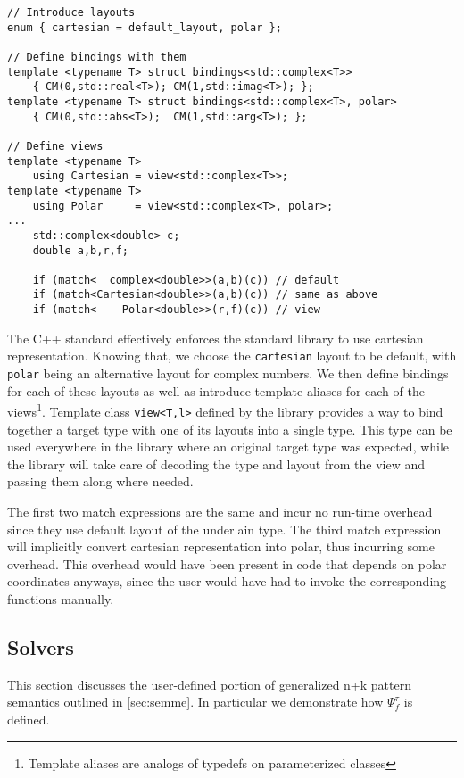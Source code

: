 \documentclass[preprint]{sigplanconf}
\makeatletter
\DeclareRobustCommand{\code}[1]{{\lstinline[breaklines=false,escapechar=@]{#1}}}
\makeatother
\begin{document}
\begin{lstlisting}
// Introduce layouts
enum { cartesian = default_layout, polar };

// Define bindings with them
template <typename T> struct bindings<std::complex<T>>
    { CM(0,std::real<T>); CM(1,std::imag<T>); };
template <typename T> struct bindings<std::complex<T>, polar>
    { CM(0,std::abs<T>);  CM(1,std::arg<T>); };

// Define views
template <typename T> 
    using Cartesian = view<std::complex<T>>;
template <typename T> 
    using Polar     = view<std::complex<T>, polar>;
...
    std::complex<double> c;
    double a,b,r,f;

    if (match<  complex<double>>(a,b)(c)) // default
    if (match<Cartesian<double>>(a,b)(c)) // same as above
    if (match<    Polar<double>>(r,f)(c)) // view
\end{lstlisting}

\noindent
The C++ standard effectively enforces the standard library to use cartesian 
representation\cite[-4]{C++0x}. Knowing that, we choose the 
\code{cartesian} layout to be default, with \code{polar} being an alternative 
layout for complex numbers. We then define bindings for each of these layouts as 
well as introduce template aliases for each of the views\footnote{Template 
aliases are analogs of typedefs on parameterized classes}. Template class 
\code{view<T,l>} defined by the library provides a way to bind together a target 
type with one of its layouts into a single type. This type can be used 
everywhere in the library where an original target type was expected, while the  
library will take care of decoding the type and layout from the view and passing 
them along where needed.

The first two match expressions are the same and incur no run-time overhead 
since they use default layout of the underlain type. The third match expression 
will implicitly convert cartesian representation into polar, thus incurring some 
overhead. This overhead would have been present in code that depends on polar 
coordinates anyways, since the user would have had to invoke the corresponding 
functions manually.

\subsection{Solvers}
\label{sec:slv}

This section discusses the user-defined portion of generalized n+k pattern 
semantics outlined in \textsection\ref{sec:semme}. In particular we demonstrate 
how $\Psi_f^\tau$ is defined.
\end{document}
